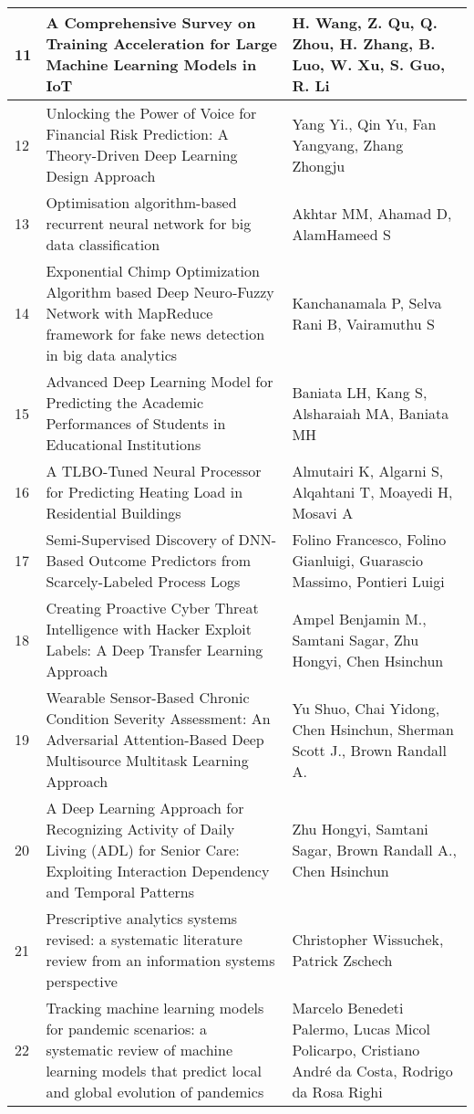 \begin{longtable}{|p{}|p{}|p{}|}
11 & A Comprehensive Survey on Training Acceleration for Large Machine Learning Models in IoT & H. Wang, Z. Qu, Q. Zhou, H. Zhang, B. Luo, W. Xu, S. Guo, R. Li \\
\hline
12 & Unlocking the Power of Voice for Financial Risk Prediction: A Theory-Driven Deep Learning Design Approach & Yang Yi., Qin Yu, Fan Yangyang, Zhang Zhongju \\
\hline
13 & Optimisation algorithm-based recurrent neural network for big data classification & Akhtar MM, Ahamad D, AlamHameed S \\
\hline
14 & Exponential Chimp Optimization Algorithm based Deep Neuro‐Fuzzy Network with MapReduce framework for fake news detection in big data analytics & Kanchanamala P, Selva Rani B, Vairamuthu S \\
\hline
15 & Advanced Deep Learning Model for Predicting the Academic Performances of Students in Educational Institutions & Baniata LH, Kang S, Alsharaiah MA, Baniata MH \\
\hline
16 & A TLBO-Tuned Neural Processor for Predicting Heating Load in Residential Buildings & Almutairi K, Algarni S, Alqahtani T, Moayedi H, Mosavi A \\
\hline
17 & Semi-Supervised Discovery of DNN-Based Outcome Predictors from Scarcely-Labeled Process Logs & Folino Francesco, Folino Gianluigi, Guarascio Massimo, Pontieri Luigi \\
\hline
18 & Creating Proactive Cyber Threat Intelligence with Hacker Exploit Labels: A Deep Transfer Learning Approach & Ampel Benjamin M., Samtani Sagar, Zhu Hongyi, Chen Hsinchun \\
\hline
19 & Wearable Sensor-Based Chronic Condition Severity Assessment: An Adversarial Attention-Based Deep Multisource Multitask Learning Approach & Yu Shuo, Chai Yidong, Chen Hsinchun, Sherman Scott J., Brown Randall A. \\
\hline
20 & A Deep Learning Approach for Recognizing Activity of Daily Living (ADL) for Senior Care: Exploiting Interaction Dependency and Temporal Patterns & Zhu Hongyi, Samtani Sagar, Brown Randall A., Chen Hsinchun \\
\hline
21 & Prescriptive analytics systems revised: a systematic literature review from an information systems perspective & Christopher Wissuchek, Patrick Zschech \\
\hline
22 & Tracking machine learning models for pandemic scenarios: a systematic review of machine learning models that predict local and global evolution of pandemics & Marcelo Benedeti Palermo, Lucas Micol Policarpo, Cristiano André da Costa, Rodrigo da Rosa Righi \\

\end{longtable}
